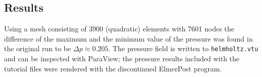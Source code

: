    

\subsection*{Results}

Using a mesh consisting of 3900 (quadratic) elements with 7601 nodes
the difference of the maximum and the minimum value of the pressure 
was found in the original run to be $\Delta p \approx 0.205$. The pressure
field is written to {\tt helmholtz.vtu} and can be inspected with ParaView;
the pressure results included with the tutorial files were rendered with the
discontinued ElmerPost program.


   





















